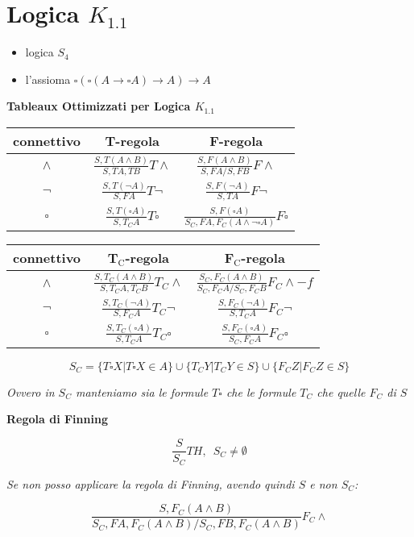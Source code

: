 \documentclass[a4paper,12pt, oneside]{book}
\begin{document}
\section*{Logica $K_{1.1}$}
\begin{itemize}
  \item logica $S_4$
  \item l'assioma $\square(\square(A\to\square A)\to A)\to A$
\end{itemize}
\begin{center}
  \textbf{Tableaux Ottimizzati per Logica $K_{1.1}$}
\end{center}
\begin{table}[H]
  \Large
  \centering
  \begin{tabular}{c||c|c}
    connettivo& T-regola& F-regola\\
    \hline
    \hline
    $\land$ & $\frac{S,T(A\land B)}{S,TA,TB}T\land$&
                        $\frac{S,F(A\land B)}{S,FA/S,FB}F\land$\\
    \hline
    $\neg$ & $\frac{S,T(\neg A)}{S,FA}T\neg$&
                        $\frac{S,F(\neg A)}{S,TA}F\neg$\\
    \hline
    $\square$ & $\frac{S,T(\square A)}{S,T_CA}T\square$&
             $\frac{S,F(\square A)}{S_C,FA,F_C(A\land\neg\square A)}F\square$\\
  \end{tabular}
\end{table}
\begin{table}[H]
  \Large
  \centering
  \begin{tabular}{c||c|c}
    connettivo& T$_{\mbox{C}}$-regola&F$_{\mbox{C}}$-regola\\
    \hline
    \hline
    $\land$ & $\frac{S,T_C(A\land B)}{S,T_CA,T_CB}T_C\land$&
              $\frac{S_C,F_C(A\land B)}{S_C,F_CA/S_C,F_CB}F_C\land -f$\\
    \hline
    $\neg$ & $\frac{S,T_C(\neg A)}{S,F_CA}T_C\neg$&
            $\frac{S,F_C(\neg A)}{S,T_CA}F_C\neg$\\
    \hline
    $\square$ & $\frac{S,T_C(\square A)}{S,T_CA}T_C\square$ &
               $\frac{S,F_C(\square A)}{S_C,F_CA}F_C\square$
  \end{tabular}
\end{table}
\[S_C=\{T\square X|T\square X\in A\}\cup\{T_CY|T_CY\in S\}\cup
  \{F_CZ|F_CZ\in S\}\]
\begin{center}
  \textit{Ovvero in $S_C$ manteniamo sia le formule $T\square$ che le formule
    $T_C$ che quelle $F_C$ di $S$}
\end{center}
\begin{center}
  \textbf{Regola di Finning}
\end{center}
\[\frac{S}{S_C}TH,\,\,\,S_C\neq \emptyset\]
\begin{center}
  \textit{Se non posso applicare la regola di Finning, avendo quindi $S$ e non
    $S_C$:} 
\end{center}
\[\frac{S,F_C(A\land B)}{S_C,FA,F_C(A\land B)/S_C,FB,F_C(A\land B)}F_C\land\]
\newpage
\end{document}
